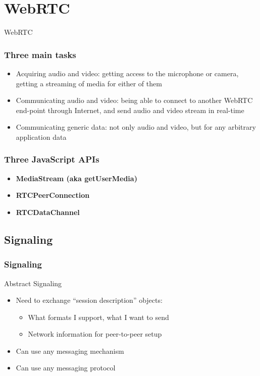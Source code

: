 \documentclass{beamer}
\begin{document}
\section{WebRTC}

\begin{frame}[c]
\Huge{\centerline{WebRTC}}

\end{frame}


\begin{frame}\frametitle{Three main tasks}
\begin{itemize}
  \item Acquiring audio and video: getting access to the microphone or camera, getting a streaming of media for either of them
  \item Communicating audio and video: being able to connect to another WebRTC end-point through Internet, and send audio and video stream in real-time
  \item Communicating generic data: not only audio and video, but for any arbitrary application data
\end{itemize}    
\end{frame}

\begin{frame}\frametitle{Three JavaScript APIs}

\begin{itemize}
  \item\textbf{\textsf{MediaStream} (aka getUserMedia)}
  \item\textbf{\textsf{RTCPeerConnection}}
  \item\textbf{\textsf{RTCDataChannel}}
\end{itemize}
\end{frame}

\subsection{Signaling}

\begin{frame}\frametitle{Signaling}
    
Abstract Signaling
\begin{itemize}
  \item Need to exchange ``session description'' objects:
  \begin{itemize}
    \item What formats I support, what I want to send
    \item Network information for peer-to-peer setup
  \end{itemize}
  \item Can use any messaging mechanism
  \item Can use any messaging protocol
\end{itemize}
\end{frame}
\end{document}

